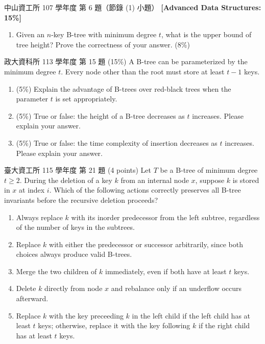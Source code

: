 \begin{pastexam}[label={px:mw-2}]{中山資工所 107 學年度 第 6 題（節錄 (1) 小題）}
\textbf{[Advanced Data Structures: 15\%]}
\begin{enumerate}[label=(\arabic*)]
\item Given an $n$-key B-tree with minimum degree $t$, what is the upper bound of tree height? Prove the correctness of your answer. (8\%)
\end{enumerate}
\end{pastexam}

\begin{pastexam}[label={px:mw-3}]{政大資科所 113 學年度 第 15 題}
(15\%) A B-tree can be parameterized by the minimum degree $t$. Every node other than the root must store at least $t-1$ keys.
\begin{enumerate}[label=\Alph*.]
\item (5\%) Explain the advantage of B-trees over red-black trees when the parameter $t$ is set appropriately.
\item (5\%) True or false: the height of a B-tree decreases as $t$ increases. Please explain your answer.
\item (5\%) True or false: the time complexity of insertion decreases as $t$ increases. Please explain your answer.
\end{enumerate}
\end{pastexam}

\begin{pastexam}[label={px:mw-4}]{臺大資工所 115 學年度 第 21 題}
(4 points) Let $T$ be a B-tree of minimum degree $t\ge 2$. During the deletion of a key $k$ from an internal node $x$, suppose $k$ is stored in $x$ at index $i$. Which of the following actions correctly preserves all B-tree invariants before the recursive deletion proceeds?
\begin{enumerate}[label=(\Alph*)]
\item Always replace $k$ with its inorder predecessor from the left subtree, regardless of the number of keys in the subtrees.
\item Replace $k$ with either the predecessor or successor arbitrarily, since both choices always produce valid B-trees.
\item Merge the two children of $k$ immediately, even if both have at least $t$ keys.
\item Delete $k$ directly from node $x$ and rebalance only if an underflow occurs afterward.
\item Replace $k$ with the key preceeding $k$ in the left child if the left child has at least $t$ keys; otherwise, replace it with the key following $k$ if the right child has at least $t$ keys.
\end{enumerate}
\end{pastexam}

